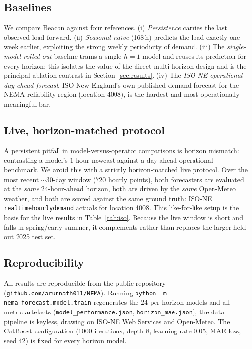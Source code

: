 \subsection{Baselines}
We compare Beacon against four references. (i) \emph{Persistence} carries the last
observed load forward. (ii) \emph{Seasonal-na\"ive} (168\,h) predicts the load
exactly one week earlier, exploiting the strong weekly periodicity of demand.
(iii) The \emph{single-model rolled-out} baseline trains a single $h=1$ model and
reuses its prediction for every horizon; this isolates the value of the direct
multi-horizon design and is the principal ablation contrast in
Section~\ref{sec:results}. (iv) The \emph{ISO-NE operational day-ahead forecast},
ISO New England's own published demand forecast for the NEMA reliability region
(location 4008), is the hardest and most operationally meaningful bar.

\subsection{Live, horizon-matched protocol}
A persistent pitfall in model-versus-operator comparisons is horizon mismatch:
contrasting a model's $1$-hour nowcast against a day-ahead operational benchmark.
We avoid this with a strictly horizon-matched live protocol. Over the most recent
$\sim$30-day window ($720$ hourly points), both forecasters are evaluated at the
\emph{same} $24$-hour-ahead horizon, both are driven by the \emph{same} Open-Meteo
weather, and both are scored against the same ground truth: ISO-NE
\texttt{realtimehourlydemand} actuals for location 4008. This like-for-like setup
is the basis for the live results in Table~\ref{tab:iso}. Because the live window
is short and falls in spring/early-summer, it complements rather than replaces the
larger held-out 2025 test set.

\subsection{Reproducibility}
All results are reproducible from the public repository
(\texttt{github.com/arunnath011/NEMA}). Running
\texttt{python -m nema\_forecast.model.train} regenerates the $24$ per-horizon
models and all metric artefacts (\texttt{model\_performance.json},
\texttt{horizon\_mae.json}); the data pipeline is keyless, drawing on ISO-NE Web
Services and Open-Meteo. The CatBoost configuration (1000 iterations, depth 8,
learning rate 0.05, MAE loss, seed 42) is fixed for every horizon model.
